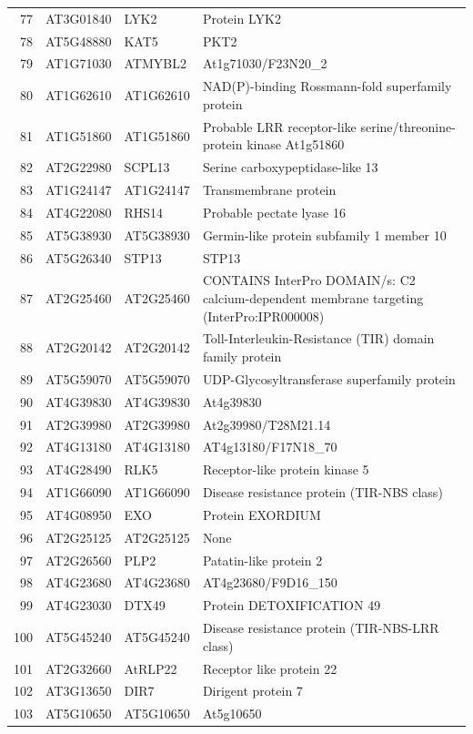 \documentclass[11pt]{article}
\begin{document}
\begin{center}
\begin{tabular}{rlll}
77 & AT3G01840 & LYK2 & Protein LYK2\\
78 & AT5G48880 & KAT5 & PKT2\\
79 & AT1G71030 & ATMYBL2 & At1g71030/F23N20\_2\\
80 & AT1G62610 & AT1G62610 & NAD(P)-binding Rossmann-fold superfamily protein\\
81 & AT1G51860 & AT1G51860 & Probable LRR receptor-like serine/threonine-protein kinase At1g51860\\
82 & AT2G22980 & SCPL13 & Serine carboxypeptidase-like 13\\
83 & AT1G24147 & AT1G24147 & Transmembrane protein\\
84 & AT4G22080 & RHS14 & Probable pectate lyase 16\\
85 & AT5G38930 & AT5G38930 & Germin-like protein subfamily 1 member 10\\
86 & AT5G26340 & STP13 & STP13\\
87 & AT2G25460 & AT2G25460 & CONTAINS InterPro DOMAIN/s: C2 calcium-dependent membrane targeting (InterPro:IPR000008)\\
88 & AT2G20142 & AT2G20142 & Toll-Interleukin-Resistance (TIR) domain family protein\\
89 & AT5G59070 & AT5G59070 & UDP-Glycosyltransferase superfamily protein\\
90 & AT4G39830 & AT4G39830 & At4g39830\\
91 & AT2G39980 & AT2G39980 & At2g39980/T28M21.14\\
92 & AT4G13180 & AT4G13180 & AT4g13180/F17N18\_70\\
93 & AT4G28490 & RLK5 & Receptor-like protein kinase 5\\
94 & AT1G66090 & AT1G66090 & Disease resistance protein (TIR-NBS class)\\
95 & AT4G08950 & EXO & Protein EXORDIUM\\
96 & AT2G25125 & AT2G25125 & None\\
97 & AT2G26560 & PLP2 & Patatin-like protein 2\\
98 & AT4G23680 & AT4G23680 & AT4g23680/F9D16\_150\\
99 & AT4G23030 & DTX49 & Protein DETOXIFICATION 49\\
100 & AT5G45240 & AT5G45240 & Disease resistance protein (TIR-NBS-LRR class)\\
101 & AT2G32660 & AtRLP22 & Receptor like protein 22\\
102 & AT3G13650 & DIR7 & Dirigent protein 7\\
103 & AT5G10650 & AT5G10650 & At5g10650\\

\end{tabular}
\end{center}
\end{document}
